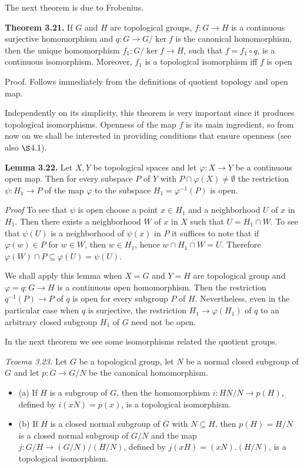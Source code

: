 \documentclass[12pt]{article}
\begin{document}
The next theorem is due to Frobenius.


\textbf{Theorem 3.21.} If $G$ and $H$ are topological groups, $f : G \to H$ is a continuous surjective homomorphism and
$q : G \to G / \ker f$ is the canonical homomorphism, then the unique homomorphism $f_1 : G/ \ker f \to H$, such that
$f = f_1 \circ q$, is a continuous isomorphism. Moreover, $f_1$ is a topological isomorphism iff $f$ is open


    Proof. Follows immediately from the definitions of quotient topology and open map.

        Independently on its simplicity, this theorem is very important since it produces topological isomorphisms.
    Openness of the map $f$ is its main ingredient, so from now on we shall be interested in providing conditions
    that ensure openness (see also $\S$4.1).


\textbf{Lemma 3.22.} Let $X, Y$ be topological spaces and let $\varphi : X \to Y$ be a continuous open map. Then for every
subspace $P$ of $Y$ with $P \cap \varphi(X) \neq \emptyset$ the restriction $\psi : H_1 \to P$ of the map $\varphi$ to the subspace $H_1 = \varphi^{-1} (P)$ is
open.


\emph{Proof} To see that $\psi$ is open choose a point $x \in H_1$ and a neighborhood $U$ of $x$ in $H_1$. Then there exists a
neighborhood $W$ of $x$ in $X$ such that $U = H_1 \cap W$. To see that $\psi(U)$ is a neighborhood of $\psi(x)$ in $P$ it suffices to
note that if $\varphi(w) \in P$ for $w \in W$, then $w \in H_1$, hence $w \cap H_1 \cap W = U$. Therefore $\varphi(W) \cap P \subseteq \varphi(U) = \psi(U)$.


    We shall apply this lemma when $X = G$ and $Y = H$ are topological group and $\varphi = q : G \to H$ is a
continuous open homomorphism. Then the restriction $q^{-1} (P) \to P$ of $q$ is open for every subgroup $P$ of $H$.
Nevertheless, even in the particular case when $q$ is surjective, the restriction $H_1 \to \varphi(H_1)$ of $q$ to an arbitrary
closed subgroup $H_1$ of $G$ need not be open.

    
    In the next theorem we see some isomorphisms related the quotient groups.


\emph{Teoema 3.23.} Let $G$ be a topological group, let $N$ be a normal closed subgroup of $G$ and let $p : G \to G/N$ be
the canonical homomorphism.

    \begin{itemize}
        
        \item (a) If $H$ is a subgroup of $G$, then the homomorphism $i : HN/N \to p(H)$, defined by $i(xN) = p(x)$, is a
        topological isomorphism.
        
        \item (b) If $H$ is a closed normal subgroup of $G$ with $N \subseteq H$, then $p(H) = H/N$ is a closed normal subgroup of $G/N$
        and the map $j : G/H \to (G/N)/(H/N)$, defined by $j(xH) = (xN).(H/N)$, is a topological isomorphism.
    
    \end{itemize}
\end{document}
